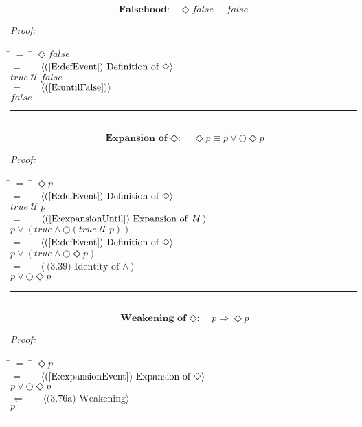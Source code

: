 \documentclass[fleqn, leqno]{article}
\newcommand{\lgap}{2pt}                             %
\newcommand{\mymathindent}{24pt}                    %
\newcommand{\Until}{\;\mathcal{U}\;}
\newcommand{\Next}{\bigcirc}
\newcommand{\Event}{\Diamond}
\newcommand{\myqed}{\hfill\rule[-.23ex]{1.2ex}{2.0ex}}
\newcommand{\Gll} {\langle}                         %
\newcommand{\Ggg} {\rangle}                         %
\newcommand{\Hint}[1]     {\ \ \ $\Gll              \mbox{#1} \Ggg$ }   %
\begin{document}
\begin{equation}\label{E:eventFalse}
\textbf{Falsehood:}\quad \Event false \equiv false
\end{equation}

\emph{Proof:}
\begin{tabbing}
\hspace{\mymathindent} \= $= \;$ \= \kill
  \> \>   $\Event false$\\[\lgap]
  \> $=$  \>  \Hint{(\ref{E:defEvent}) Definition of $\Event$}\\[\lgap]
  \> \>   $true \Until false$\\[\lgap]
  \> $=$  \>  \Hint{(\ref{E:untilFalse})}\\[\lgap]
  \> \>   $false$\\[\lgap]
\end{tabbing}
\myqed\\[\lgap]


\begin{equation}\label{E:expansionEvent}
\textbf{Expansion of $\Event$:}\quad \Event p \equiv p \lor \Next\Event p
\end{equation}

\emph{Proof:}
\begin{tabbing}
\hspace{\mymathindent} \= $= \;$ \= \kill
  \> \>   $\Event p$\\[\lgap]
  \> $=$  \>  \Hint{(\ref{E:defEvent}) Definition of $\Event$}\\[\lgap]
  \> \>   $true \Until p$\\[\lgap]
  \> $=$  \>  \Hint{(\ref{E:expansionUntil}) Expansion of $\Until$}\\[\lgap]
  \> \>   $p \lor (true \land \Next(true \Until p))$\\[\lgap]
  \> $=$  \>  \Hint{(\ref{E:defEvent}) Definition of $\Event$}\\[\lgap]
  \> \>   $p \lor (true \land \Next\Event p)$\\[\lgap]
  \> $=$  \>  \Hint{(3.39) Identity of $\land$}\\[\lgap]
  \> \>   $p \lor \Next\Event p$\\[\lgap]
\end{tabbing}
\myqed\\[\lgap]

\begin{equation}\label{E:impEvent}
\textbf{Weakening of $\Event$:}\quad p \Rightarrow \Event p
\end{equation}

\emph{Proof:}
\begin{tabbing}
\hspace{\mymathindent} \= $= \;$ \= \kill
  \> \>   $\Event p$\\[\lgap]
  \> $=$  \>  \Hint{(\ref{E:expansionEvent}) Expansion of $\Event$}\\[\lgap]
  \> \>   $p \lor \Next\Event p$\\[\lgap]
  \> $\Leftarrow$  \>  \Hint{(3.76a) Weakening}\\[\lgap]
  \> \>   $p$\\[\lgap]
\end{tabbing}
\myqed\\[\lgap]
\end{document}
